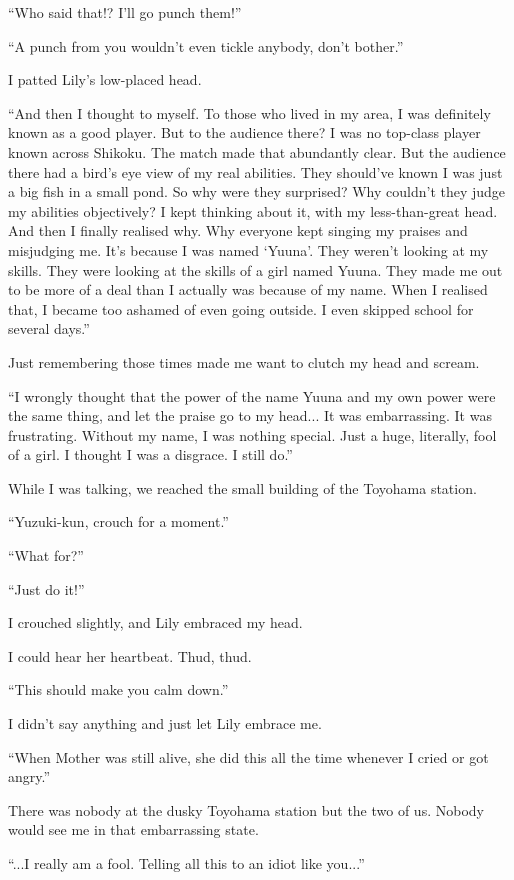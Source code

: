 ``Who said that!? I'll go punch them!''

``A punch from you wouldn't even tickle anybody, don't bother.''

I patted Lily's low-placed head.

``And then I thought to myself. To those who lived in my area, I was definitely known as a good player. But to the audience there? I was no top-class player known across Shikoku. The match made that abundantly clear. But the audience there had a bird's eye view of my real abilities. They should've known I was just a big fish in a small pond. So why were they surprised? Why couldn't they judge my abilities objectively? I kept thinking about it, with my less-than-great head. And then I finally realised why. Why everyone kept singing my praises and misjudging me. It's because I was named `Yuuna'. They weren't looking at my skills. They were looking at the skills of a girl named Yuuna. They made me out to be more of a deal than I actually was because of my name. When I realised that, I became too ashamed of even going outside. I even skipped school for several days.''

Just remembering those times made me want to clutch my head and scream.

``I wrongly thought that the power of the name Yuuna and my own power were the same thing, and let the praise go to my head... It was embarrassing. It was frustrating. Without my name, I was nothing special. Just a huge, literally, fool of a girl. I thought I was a disgrace. I still do.''

While I was talking, we reached the small building of the Toyohama station.

``Yuzuki-kun, crouch for a moment.''

``What for?''

``Just do it!''

I crouched slightly, and Lily embraced my head.

I could hear her heartbeat. Thud, thud.

``This should make you calm down.''

I didn't say anything and just let Lily embrace me.

``When Mother was still alive, she did this all the time whenever I cried or got angry.''

There was nobody at the dusky Toyohama station but the two of us. Nobody would see me in that embarrassing state.

``...I really am a fool. Telling all this to an idiot like you...''

